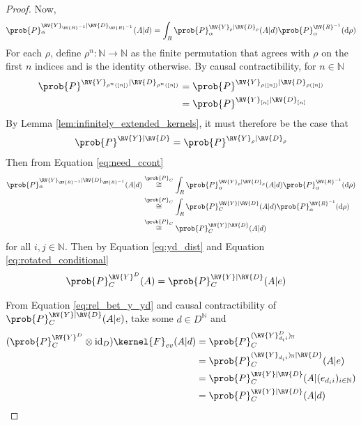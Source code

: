 \begin{proof}
Now,
\begin{align}
    \prob{P}^{\RV{Y}_{\RV{R}^{-1}}|\RV{D}_{\RV{R}^{-1}}}_\alpha(A|d) &= \int_R \prob{P}_\alpha^{\RV{Y}_\rho|\RV{D}_{\rho}}(A|d)\prob{P}_\alpha^{\RV{R}^{-1}}(\mathrm{d}\rho)\label{eq:need_ccont}\\
\end{align}
For each $\rho$, define $\rho^n:\mathbb{N}\to \mathbb{N}$ as the finite permutation that agrees with $\rho$ on the first $n$ indices and is the identity otherwise. By causal contractibility, for $n\in \mathbb{N}$
\begin{align}
    \prob{P}^{\RV{Y}_{\rho^n([n])}|\RV{D}_{\rho^n([n])}} &= \prob{P}^{\RV{Y}_{\rho([n])}|\RV{D}_{\rho([n])}}\\
    &= \prob{P}^{\RV{Y}_{[n]}|\RV{D}_{[n]}}
\end{align}
By Lemma \ref{lem:infinitely_extended_kernels}, it must therefore be the case that
\begin{align}
    \prob{P}^{\RV{Y}|\RV{D}} = \prob{P}^{\RV{Y}_{\rho}|\RV{D}_{\rho}}
\end{align}
Then from Equation \ref{eq:need_ccont}
\begin{align}
    \prob{P}^{\RV{Y}_{\RV{R}^{-1}}|\RV{D}_{\RV{R}^{-1}}}_\alpha(A|d) &\overset{\prob{P}_C}{\cong} \int_R \prob{P}_\alpha^{\RV{Y}_\rho|\RV{D}_{\rho}}(A|d)\prob{P}_\alpha^{\RV{R}^{-1}}(\mathrm{d}\rho)\\
    &\overset{\prob{P}_C}{\cong} \int_R \prob{P}_C^{\RV{Y}|\RV{D}}(A|d)\prob{P}_\alpha^{\RV{R}^{-1}}(\mathrm{d}\rho)\\
    &\overset{\prob{P}_C}{\cong} \prob{P}_C^{\RV{Y}|\RV{D}}(A|d)\label{eq:rotated_conditional}
\end{align}
 for all $i,j\in \mathbb{N}$. Then by Equation \ref{eq:yd_dist} and Equation \ref{eq:rotated_conditional}
\begin{align}
    \prob{P}_C^{\RV{Y}^D}(A) &= \prob{P}_C^{\RV{Y}|\RV{D}}(A|e)\label{eq:rel_bet_y_yd}
\end{align}

From Equation \ref{eq:rel_bet_y_yd} and causal contractibility of $\prob{P}_C^{\RV{Y}|\RV{D}}(A|e)$, take some $d\in D^{\mathbb{N}}$ and
\begin{align}
    (\prob{P}_C^{\RV{Y}^D}\otimes \mathrm{id}_D)\kernel{F}_{ev}(A|d) &= \prob{P}_C^{(\RV{Y}^D_{d_i i})_{\mathbb{N}}}\\
    &=\prob{P}_C^{(\RV{Y}_{d_i i})_{\mathbb{N}}|\RV{D}}(A|e)\\
    &= \prob{P}_C^{\RV{Y}|\RV{D}}(A|(e_{d_i i})_{i\in \mathbb{N}})\\
    &= \prob{P}_C^{\RV{Y}|\RV{D}}(A|d)
\end{align}


\end{proof}
